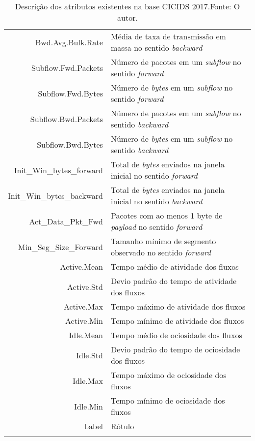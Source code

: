 \begin{longtable}{r|p{10.5cm}}
    Bwd.Avg.Bulk.Rate & Média de taxa de transmissão em massa no sentido \textit{backward} \\
    Subflow.Fwd.Packets & Número de pacotes em um \textit{subflow} no sentido \textit{forward} \\
    Subflow.Fwd.Bytes & Número de \textit{bytes} em um \textit{subflow} no sentido \textit{forward} \\
    Subflow.Bwd.Packets & Número de pacotes em um \textit{subflow} no sentido \textit{backward} \\
    Subflow.Bwd.Bytes & Número de \textit{bytes} em um \textit{subflow} no sentido \textit{backward} \\
    Init\_Win\_bytes\_forward & Total de \textit{bytes} enviados na janela inicial no sentido \textit{forward} \\
    Init\_Win\_bytes\_backward & Total de \textit{bytes} enviados na janela inicial no sentido \textit{backward} \\
    Act\_Data\_Pkt\_Fwd & Pacotes com ao menos 1 byte de \textit{payload} no sentido \textit{forward} \\
    Min\_Seg\_Size\_Forward & Tamanho mínimo de segmento observado no sentido \textit{forward} \\
    Active.Mean & Tempo médio de atividade dos fluxos \\
    Active.Std & Devio padrão do tempo de atividade dos fluxos \\
    Active.Max & Tempo máximo de atividade dos fluxos \\
    Active.Min & Tempo mínimo de atividade dos fluxos \\
    Idle.Mean & Tempo médio de ociosidade dos fluxos \\
    Idle.Std & Devio padrão do tempo de ociosidade dos fluxos \\
    Idle.Max & Tempo máximo de ociosidade dos fluxos \\
    Idle.Min & Tempo mínimo de ociosidade dos fluxos \\
    Label & Rótulo \\
    \hline
    \caption{Descrição dos atributos existentes na base CICIDS 2017.\newline Fonte: O autor.}
    \label{tab:atributos-cic}
\end{longtable}